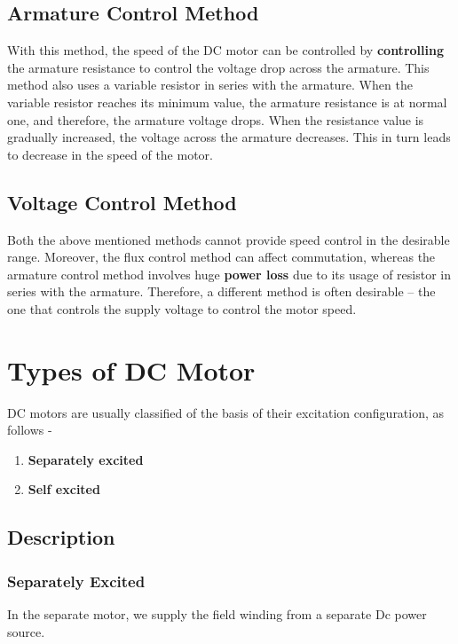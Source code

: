 \documentclass{article}
\begin{document}
\subsection{Armature Control Method}
With this method, the speed of the DC motor can be controlled by \textbf{controlling} the armature resistance to control the voltage drop across the armature. This method also uses a variable resistor in series with the armature.
When the variable resistor reaches its minimum value, the armature resistance is at normal one, and therefore, the armature voltage drops. When the resistance value is gradually increased, the voltage across the armature decreases. This in turn leads to decrease in the speed of the motor.
\subsection{Voltage Control Method}
Both the above mentioned methods cannot provide speed control in the desirable range. Moreover, the flux control method can affect commutation, whereas the armature control method involves huge \textbf{power loss} due to its usage of resistor in series with the armature. Therefore, a different method is often desirable – the one that controls the supply voltage to control the motor speed.
\section{Types of DC Motor}
DC motors are usually classified of the basis of their excitation configuration, as follows -
\begin{enumerate}
    \item \textbf{Separately excited } 
    \item \textbf{Self excited }
    \end{enumerate}
    \subsection{Description}
    \subsubsection{Separately Excited}In the separate motor, we supply the field winding from a separate Dc power source.
\end{document}
